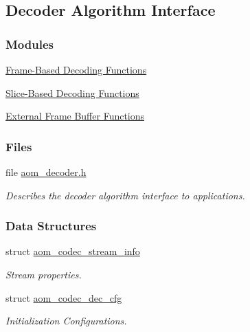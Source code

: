 \hypertarget{group__decoder}{}\subsection{Decoder Algorithm Interface}
\label{group__decoder}
\subsubsection*{Modules}
\begin{DoxyCompactItemize}
\item 
\hyperlink{group__cap__put__frame}{Frame-\/\+Based Decoding Functions}
\item 
\hyperlink{group__cap__put__slice}{Slice-\/\+Based Decoding Functions}
\item 
\hyperlink{group__cap__external__frame__buffer}{External Frame Buffer Functions}
\end{DoxyCompactItemize}
\subsubsection*{Files}
\begin{DoxyCompactItemize}
\item 
file \hyperlink{aom__decoder_8h}{aom\+\_\+decoder.\+h}
\begin{DoxyCompactList}\small\item\em Describes the decoder algorithm interface to applications. \end{DoxyCompactList}\end{DoxyCompactItemize}
\subsubsection*{Data Structures}
\begin{DoxyCompactItemize}
\item 
struct \hyperlink{structaom__codec__stream__info}{aom\+\_\+codec\+\_\+stream\+\_\+info}
\begin{DoxyCompactList}\small\item\em Stream properties. \end{DoxyCompactList}\item 
struct \hyperlink{structaom__codec__dec__cfg}{aom\+\_\+codec\+\_\+dec\+\_\+cfg}
\begin{DoxyCompactList}\small\item\em Initialization Configurations. \end{DoxyCompactList}\end{DoxyCompactItemize}
